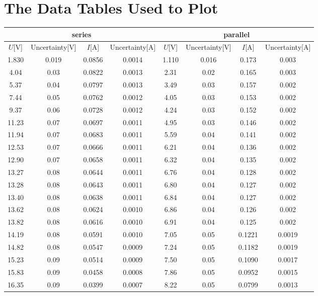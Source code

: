 \documentclass[a4paper]{article}
\begin{document}
    \section{The Data Tables Used to Plot}
    \begin{table}[H]
        \centering
        \begin{tabular}{|c|c|c|c||c|c|c|c|}
            \hline
            \multicolumn{4}{|c||}{series}&\multicolumn{4}{c|}{parallel}\\\hline
            $U$[V]&Uncertainty[V]&$I$[A]&Uncertainty[A]&$U$[V]&Uncertainty[V]&$I$[A]&Uncertainty[A]\\\hline
            1.830&0.019&0.0856&0.0014&1.110&0.016&0.173&0.003\\\hline
            4.04&0.03&0.0822&0.0013&2.31&0.02&0.165&0.003\\\hline
            5.37&0.04&0.0797&0.0013&3.49&0.03&0.157&0.002\\\hline
            7.44&0.05&0.0762&0.0012&4.05&0.03&0.153&0.002\\\hline
            9.37&0.06&0.0728&0.0012&4.24&0.03&0.152&0.002\\\hline
            11.23&0.07&0.0697&0.0011&4.95&0.03&0.146&0.002\\\hline
            11.94&0.07&0.0683&0.0011&5.59&0.04&0.141&0.002\\\hline
            12.53&0.07&0.0666&0.0011&6.21&0.04&0.136&0.002\\\hline
            12.90&0.07&0.0658&0.0011&6.32&0.04&0.135&0.002\\\hline
            13.27&0.08&0.0644&0.0011&6.76&0.04&0.128&0.002\\\hline
            13.28&0.08&0.0643&0.0011&6.80&0.04&0.127&0.002\\\hline
            13.40&0.08&0.0638&0.0011&6.84&0.04&0.127&0.002\\\hline
            13.62&0.08&0.0624&0.0010&6.86&0.04&0.126&0.002\\\hline
            13.82&0.08&0.0616&0.0010&6.91&0.04&0.125&0.002\\\hline
            14.19&0.08&0.0591&0.0010&7.05&0.05&0.1221&0.0019\\\hline
            14.82&0.08&0.0547&0.0009&7.24&0.05&0.1182&0.0019\\\hline
            15.23&0.09&0.0514&0.0009&7.50&0.05&0.1090&0.0017\\\hline
            15.83&0.09&0.0458&0.0008&7.86&0.05&0.0952&0.0015\\\hline
            16.35&0.09&0.0399&0.0007&8.22&0.05&0.0799&0.0013\\\hline

\end{tabular}
\end{table}
\end{document}

